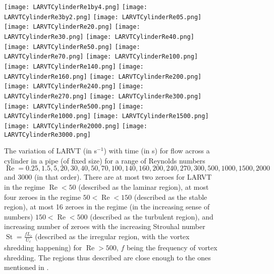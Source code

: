 \documentclass{article}
\begin{document}
\begin{figure}
\texttt{[image: LARVTCylinderRe1by4.png]}
\texttt{[image: LARVTCylinderRe3by2.png]}
\texttt{[image: LARVTCylinderRe05.png]}
\texttt{[image: LARVTCylinderRe20.png]}
\texttt{[image: LARVTCylinderRe30.png]}
\texttt{[image: LARVTCylinderRe40.png]}
\texttt{[image: LARVTCylinderRe50.png]}
\texttt{[image: LARVTCylinderRe70.png]}
\texttt{[image: LARVTCylinderRe100.png]}
\texttt{[image: LARVTCylinderRe140.png]}
\texttt{[image: LARVTCylinderRe160.png]}
\texttt{[image: LARVTCylinderRe200.png]}
\texttt{[image: LARVTCylinderRe240.png]}
\texttt{[image: LARVTCylinderRe270.png]}
\texttt{[image: LARVTCylinderRe300.png]}
\texttt{[image: LARVTCylinderRe500.png]}
\texttt{[image: LARVTCylinderRe1000.png]}
\texttt{[image: LARVTCylinderRe1500.png]}
\texttt{[image: LARVTCylinderRe2000.png]}
\texttt{[image: LARVTCylinderRe3000.png]}
\caption{\label{Fig3} The variation of LARVT (in s$^{-1}$) with time (in s) for flow across a cylinder in a pipe (of fixed size) for a range of Reynolds numbers $\operatorname{Re} = 0.25, 1.5, 5, 20, 30, 40, 50, 70, 100, 140, 160, 200, 240, 270, 300, 500, 1000, 1500, 2000$ and $3000$ (in that order). There are at most two zeroes for LARVT in the regime $\operatorname{Re} < 50$ (described as the laminar region), at most four zeroes in the regime $50 < \operatorname{Re} < 150$ (described as the stable region), at most 16 zeroes in the regime (in the increasing sense of numbers) $150 < \operatorname{Re} < 500$ (described as the turbulent region), and increasing number of zeroes with the increasing Strouhal number $\operatorname{St} = \frac{f L_c}{U_c}$ (described as the irregular region, with the vortex shredding happening) for $\operatorname{Re}>500$, $f$ being the frequency of vortex shredding. The regions thus described are close enough to the ones mentioned in \cite{roshko}.}
\end{figure}
\end{document}
